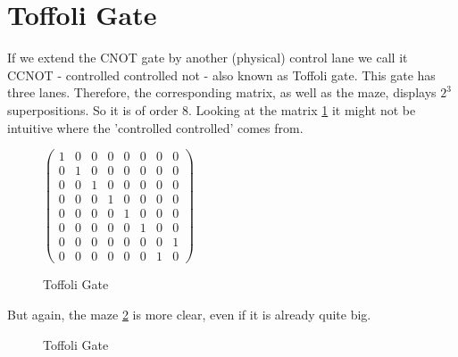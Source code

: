 \documentclass[oneside]{thesisclass}
\begin{document}
\section{Toffoli Gate}
If we extend the CNOT gate by another (physical) control lane we call it CCNOT - controlled controlled not - also known as Toffoli gate.
This gate has three lanes.
Therefore, the corresponding matrix, as well as the maze, displays $2^3$ superpositions.
So it is of order 8.
Looking at the matrix \ref{tof} it might not be intuitive where the 'controlled controlled' comes from.
\begin{figure}
 \begin{center}
  $
  \begin{pmatrix}
  1 & 0 & 0 & 0 & 0 & 0 & 0 & 0 \\
  0 & 1 & 0 & 0 & 0 & 0 & 0 & 0 \\
  0 & 0 & 1 & 0 & 0 & 0 & 0 & 0 \\
  0 & 0 & 0 & 1 & 0 & 0 & 0 & 0 \\
  0 & 0 & 0 & 0 & 1 & 0 & 0 & 0 \\
  0 & 0 & 0 & 0 & 0 & 1 & 0 & 0 \\
  0 & 0 & 0 & 0 & 0 & 0 & 0 & 1 \\
  0 & 0 & 0 & 0 & 0 & 0 & 1 & 0
  \end{pmatrix}
  $
  \caption{Toffoli Gate}
  \label{tof}
 \end{center}
\end{figure}
But again, the maze \ref{tofM} is more clear, even if it is already quite big. 
\begin{figure}
 \begin{center}
  \caption{Toffoli Gate}
  \label{tofM}
 \end{center}
\end{figure}
\end{document}
